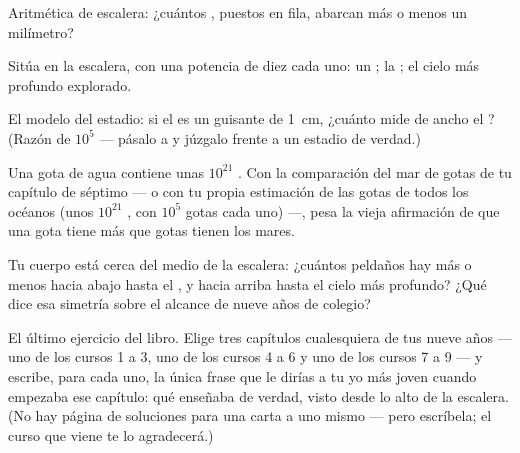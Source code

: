 \begin{exercise}[$\star$]\label{exo:g9:atoms-to-galaxies:7}
Aritmética de escalera: ¿cuántos , puestos en fila, abarcan
más o menos un milímetro?
\end{exercise}

\begin{exercise}[$\star$]\label{exo:g9:atoms-to-galaxies:8}
Sitúa en la escalera, con una potencia de diez cada uno: un
; la ; el cielo más profundo
explorado.
\end{exercise}

\begin{exercise}[$\star\star$]\label{exo:g9:atoms-to-galaxies:9}
El modelo del estadio: si el  es un guisante de
\qty{1}{cm}, ¿cuánto mide de ancho el ? (Razón de
$10^{5}$ --- pásalo a  y júzgalo frente a un estadio de
verdad.)
\end{exercise}

\begin{exercise}[$\star\star$]\label{exo:g9:atoms-to-galaxies:10}
Una gota de agua contiene unas $10^{21}$ . Con la
comparación del mar de gotas de tu capítulo de séptimo --- o con tu
propia estimación de las gotas de todos los océanos (unos $10^{21}$
, con $10^{5}$ gotas cada uno) ---, pesa la vieja afirmación
de que una gota tiene más  que gotas tienen los mares.
\end{exercise}

\begin{exercise}[$\star\star$]\label{exo:g9:atoms-to-galaxies:11}
Tu cuerpo está cerca del medio de la escalera: ¿cuántos peldaños hay
más o menos hacia abajo hasta el , y hacia arriba hasta el
cielo más profundo? ¿Qué dice esa simetría sobre el alcance de nueve
años de colegio?
\end{exercise}

\begin{exercise}[$\star\star\star$]\label{exo:g9:atoms-to-galaxies:12}
El último ejercicio del libro. Elige tres capítulos cualesquiera de tus
nueve años --- uno de los cursos 1 a 3, uno de los cursos 4 a 6 y uno
de los cursos 7 a 9 --- y escribe, para cada uno, la única frase que le
dirías a tu yo más joven cuando empezaba ese capítulo: qué enseñaba de
verdad, visto desde lo alto de la escalera. (No hay página de
soluciones para una carta a uno mismo --- pero escríbela; el curso que
viene te lo agradecerá.)
\end{exercise}

